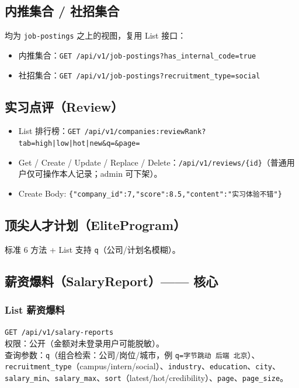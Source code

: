 \documentclass[11pt,a4paper]{ctexart}
\begin{document}
\subsection{内推集合 / 社招集合}
均为 \texttt{job-postings} 之上的视图，复用 List 接口：
\begin{itemize}[leftmargin=2em]
    \item 内推集合：\texttt{GET /api/v1/job-postings?has\_internal\_code=true}
    \item 社招集合：\texttt{GET /api/v1/job-postings?recruitment\_type=social}
\end{itemize}

\subsection{实习点评（Review）}
\begin{itemize}[leftmargin=2em]
    \item List 排行榜：\texttt{GET /api/v1/companies:reviewRank?tab=high|low|hot|new\&q=\&page=}
    \item Get / Create / Update / Replace / Delete：\texttt{/api/v1/reviews/\{id\}}（普通用户仅可操作本人记录；admin 可下架）。
    \item Create Body: \texttt{\{"company\_id":7,"score":8.5,"content":"实习体验不错"\}}
\end{itemize}

\subsection{顶尖人才计划（EliteProgram）}
标准 6 方法 + List 支持 \texttt{q}（公司/计划名模糊）。

\subsection{薪资爆料（SalaryReport）—— 核心}
\subsubsection{List 薪资爆料}
\texttt{GET /api/v1/salary-reports}\\
权限：公开（金额对未登录用户可能脱敏）。\\
查询参数：\texttt{q}（组合检索：公司/岗位/城市，例 \texttt{q=字节跳动 后端 北京}）、\texttt{recruitment\_type}（campus/intern/social）、\texttt{industry}、\texttt{education}、\texttt{city}、\texttt{salary\_min}、\texttt{salary\_max}、\texttt{sort}（latest/hot/credibility）、\texttt{page}、\texttt{page\_size}。
\end{document}
